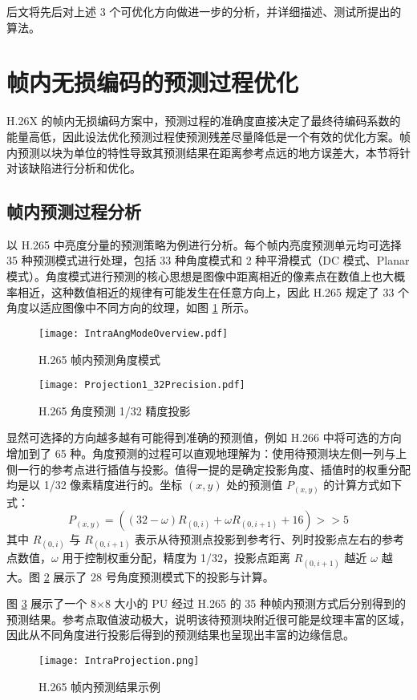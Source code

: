 后文将先后对上述 3 个可优化方向做进一步的分析，并详细描述、测试所提出的算法。

\section{帧内无损编码的预测过程优化}
\label{cha:L-IPSec}
H.26X 的帧内无损编码方案中，预测过程的准确度直接决定了最终待编码系数的能量高低，因此设法优化预测过程使预测残差尽量降低是一个有效的优化方案。帧内预测以块为单位的特性导致其预测结果在距离参考点远的地方误差大，本节将针对该缺陷进行分析和优化。

\subsection{帧内预测过程分析}
\label{cha:IntraPredDetail}
以 H.265 中亮度分量的预测策略为例进行分析。每个帧内亮度预测单元均可选择 35 种预测模式进行处理，包括 33 种角度模式和 2 种平滑模式（DC 模式、Planar 模式）。角度模式进行预测的核心思想是图像中距离相近的像素点在数值上也大概率相近，这种数值相近的规律有可能发生在任意方向上，因此 H.265 规定了 33 个角度以适应图像中不同方向的纹理，如图 \ref{fig:IntraAngModeOverview} 所示。
\begin{figure}[hbt]
    \centering
    \texttt{[image: IntraAngModeOverview.pdf]}
    \caption{H.265 帧内预测角度模式}
    \label{fig:IntraAngModeOverview}
\end{figure}
\begin{figure}[hbt]
    \centering
    \texttt{[image: Projection1\_32Precision.pdf]}
    \caption{H.265 角度预测 1/32 精度投影}
    \label{fig:Projection1_32Precision}
\end{figure}
显然可选择的方向越多越有可能得到准确的预测值，例如 H.266 中将可选的方向增加到了 65 种。角度预测的过程可以直观地理解为：使用待预测块左侧一列与上侧一行的参考点进行插值与投影。值得一提的是确定投影角度、插值时的权重分配均是以 1/32 像素精度进行的。坐标 $(x,y)$ 处的预测值 $P_{(x,y)}$ 的计算方式如下式：
\begin{equation}
    P_{(x,y)}=((32-\omega)R_{(0,i)}+\omega R_{(0,i+1)}+16)>>5
    \label{equ:IntraProjection}
\end{equation}
其中 $R_{(0,i)}$ 与 $R_{(0,i+1)}$ 表示从待预测点投影到参考行、列时投影点左右的参考点数值，$\omega$ 用于控制权重分配，精度为 1/32，投影点距离 $R_{(0,i+1)}$ 越近 $\omega$ 越大。图 \ref{fig:Projection1_32Precision} 展示了 28 号角度预测模式下的投影与计算。

图 \ref{fig:IntraProjection} 展示了一个 8$\times$8 大小的 PU 经过 H.265 的 35 种帧内预测方式后分别得到的预测结果。参考点取值波动极大，说明该待预测块附近很可能是纹理丰富的区域，因此从不同角度进行投影后得到的预测结果也呈现出丰富的边缘信息。
\begin{figure}[hbt]
    \centering
    \texttt{[image: IntraProjection.png]}
    \caption{H.265 帧内预测结果示例}
    \label{fig:IntraProjection}
\end{figure}

